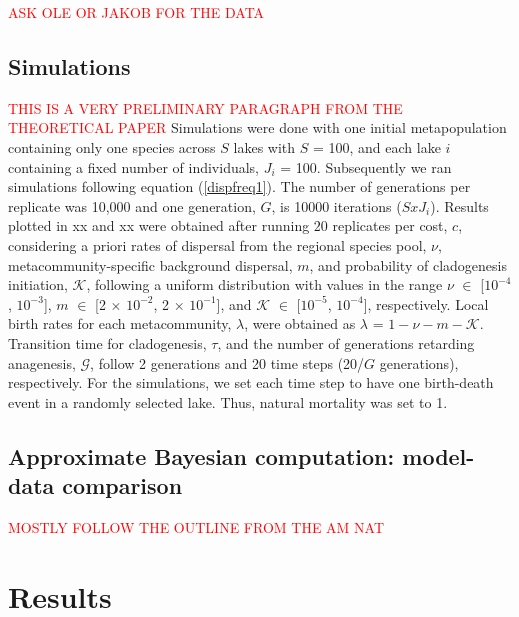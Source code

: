 \documentclass[11pt]{article}
\newcommand{\carlos}[1]{\textcolor{Red}{#1}}
\begin{document}
{\carlos{ASK OLE OR JAKOB FOR THE DATA}


\subsection{Simulations}

\carlos{THIS IS A VERY PRELIMINARY PARAGRAPH FROM THE THEORETICAL PAPER}
Simulations were done with one initial metapopulation containing only
one species across $S$ lakes with $S$ = 100, and each lake $i$
containing a fixed number of individuals, $J_{i}$ = 100. Subsequently
we ran simulations following equation (\ref{dispfreq1}). The number of
generations per replicate was 10,000 and one generation, $G$, is
10000 iterations ($S x J_{i}$).
Results plotted in xx and xx were obtained after running $20$
replicates per cost, $c$, considering a priori rates of dispersal from
the regional species pool, $\nu$, metacommunity-specific background
dispersal, $m$, and probability of cladogenesis initiation,
$\mathcal{K}$, following a uniform distribution with values in the
range $\nu$ $\in$ [$10^{-4}$, $10^{-3}$], $m$ $\in$ [2 $\times$
$10^{-2}$, 2 $\times$ $10^{-1}$], and $\mathcal{K}$ $\in$ [$10^{-5}$,
$10^{-4}$], respectively. Local birth rates for each metacommunity,
$\lambda$, were obtained as $\lambda$ = $1 - \nu - m -
\mathcal{K}$. Transition time for cladogenesis, $\tau$, and the number
of generations retarding anagenesis, $\mathcal{G}$, follow 2
generations and 20 time steps (20/$G$ generations), respectively. For the
simulations, we set each time step to have one birth-death event in a
randomly selected lake. Thus, natural mortality was set to 1.

\subsection{Approximate Bayesian computation: model-data comparison}

\carlos{MOSTLY FOLLOW THE OUTLINE FROM THE AM NAT}

\section{Results}

}
\end{document}
